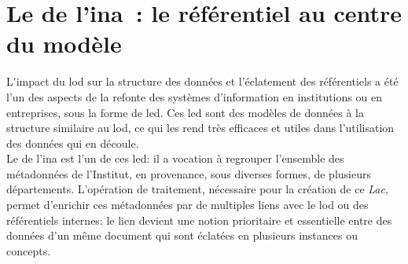 \chapter{\label{III-B}Le \ldd de l’\ac{ina} : le référentiel au centre du modèle}

\lettrine{L}'impact du \ac{lod} sur la structure des données et l'éclatement des référentiels a été l'un des aspects de la refonte des systèmes d'information en institutions ou en entreprises, sous la forme de \ac{led}. Ces \ac{led} sont des modèles de données à la structure similaire au \ac{lod}, ce qui les rend très efficaces et utiles dans l'utilisation des données qui en découle.\\

Le \ldd de l'\ac{ina} est l'un de ces \ac{led}: il a vocation à regrouper l'ensemble des métadonnées de l'Institut, en provenance, sous diverses formes, de plusieurs départements.  L'opération de traitement, nécessaire pour la création de ce \textit{Lac}, permet d'enrichir ces métadonnées par de multiples liens avec le \ac{lod} ou des référentiels internes: le lien devient une notion prioritaire et essentielle entre des données d'un même document qui sont éclatées en plusieurs instances ou concepts.




